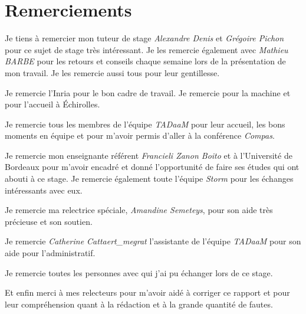 \section{Remerciements}

Je tiens à remercier mon tuteur de stage \emph{Alexandre Denis} et \emph{Grégoire Pichon} pour ce sujet de stage très intéressant.
Je les remercie également avec \emph{Mathieu BARBE} pour les retours et conseils chaque semaine lors de la présentation de mon travail.
Je les remercie aussi tous pour leur gentillesse.

Je remercie l'Inria pour le bon cadre de travail.
Je remercie \atos{} pour la machine et pour l'accueil à Échirolles.

Je remercie tous les membres de l'équipe \emph{TADaaM} pour leur accueil, les bons moments en équipe et pour m'avoir permis d'aller à la conférence \emph{Compas}.

Je remercie mon enseignante référent \emph{Francieli Zanon Boito} et à l'Université de Bordeaux pour m'avoir encadré et donné l'opportunité de faire ses études qui ont abouti à ce stage.
Je remercie également toute l'équipe \emph{Storm} pour les échanges intéressants avec eux.

Je remercie ma relectrice spéciale, \emph{Amandine Semeteys}, pour son aide très précieuse et son soutien.

Je remercie \emph{Catherine Cattaert_megrat} l'assistante de l'équipe \emph{TADaaM} pour son aide pour l'administratif.

Je remercie toutes les personnes avec qui j'ai pu échanger lors de ce stage.

Et enfin merci à mes relecteurs pour m'avoir aidé à corriger ce rapport et pour leur compréhension quant à la rédaction et à la grande quantité de fautes.
